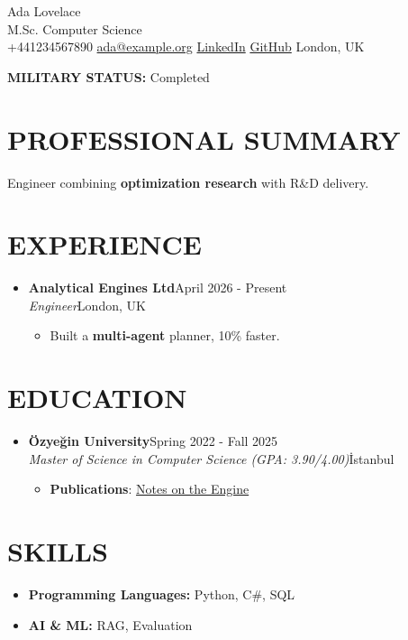 \documentclass[a4paper,11pt]{article}
\newcommand{\resumeSubHeadingListStart}{\begin{itemize}[leftmargin=0pt, label={}, itemsep=5pt]}
\newcommand{\resumeSubHeadingListEnd}{\end{itemize}}
\newcommand{\resumeItemListStart}{\begin{itemize}}
\newcommand{\resumeItemListEnd}{\end{itemize}}
\newcommand{\resumeItem}[1]{\item #1}
\newcommand{\resumeSubheading}[4]{%
  \item \textbf{#1}\hfill{\color{muted}#2}\\
  \textit{#3}\hfill{\color{muted}\small #4}}
\newcommand{\cvname}[1]{{\Huge #1}\\[2pt]}
\newcommand{\cvheadline}[1]{{\large\color{accent} #1}\\[4pt]}
\newcommand{\cvsep}{\enspace{\color{muted}|}\enspace}
\begin{document}
\begin{center}
  \cvname{Ada Lovelace}
  \cvheadline{M.Sc. Computer Science}
  \small
+441234567890\cvsep
\href{mailto:ada@example.org}{ada@example.org}\cvsep
\href{https://www.linkedin.com/in/ada/}{LinkedIn}\cvsep
\href{https://github.com/ada}{GitHub}\cvsep
London, UK
\end{center}

\textbf{MILITARY STATUS:} Completed\par

\section{PROFESSIONAL SUMMARY}
Engineer combining \textbf{optimization research} with R\&D delivery.
%

\section{EXPERIENCE}
\resumeSubHeadingListStart
  \resumeSubheading
    {Analytical Engines Ltd}{April 2026 - Present}
    {Engineer}{London, UK}
    \resumeItemListStart
      \resumeItem{Built a \textbf{multi-agent} planner, 10\% faster.}
    \resumeItemListEnd
\resumeSubHeadingListEnd

\section{EDUCATION}
\resumeSubHeadingListStart
  \resumeSubheading
    {\"{O}zye\u{g}in University}{Spring 2022 - Fall 2025}
    {Master of Science in Computer Science (GPA: 3.90/4.00)}{\.{I}stanbul}
    \resumeItemListStart
      \resumeItem{\textbf{Publications}: \href{https://example.org/paper\#1}{Notes on the Engine}}
    \resumeItemListEnd
\resumeSubHeadingListEnd

\section{SKILLS}
\begin{itemize}[leftmargin=0pt, label={}, itemsep=2pt]
  \item \textbf{Programming Languages:} Python, C\#, SQL
  \item \textbf{AI \& ML:} RAG, Evaluation
\end{itemize}
\end{document}
